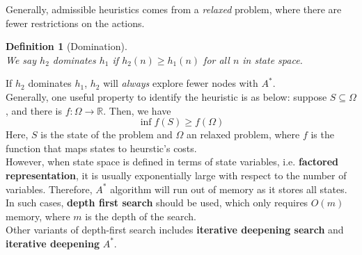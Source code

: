 \documentclass[12pt]{article}
\newtheorem{definition}{Definition}[section]
\theoremstyle{definition}
\begin{document}
Generally, admissible heuristics comes from a \textit{relaxed} problem, where there are fewer restrictions on the actions.
\begin{definition}[Domination]
\hfill\\\normalfont We say $h_2$ dominates $h_1$ if $h_2(n)\geq h_1(n)$ for all $n$ in state space.
\end{definition}
If $h_2$ dominates $h_1$, $h_2$ will \textit{always} explore fewer nodes with $A^\ast$.\\
Generally, one useful property to identify the heuristic is as below: suppose $S\subseteq \Omega$, and there is $f:\Omega\to \mathbb{R}$. Then, we have
\[
\inf f(S) \geq f(\Omega)
\]
Here, $S$ is the state of the problem and $\Omega$ an relaxed problem, where $f$ is the function that maps states to heurstic's costs.\\

However, when state space is defined in terms of state variables, i.e. \textbf{factored representation}, it is usually exponentially large with respect to the number of variables. Therefore, $A^\ast$ algorithm will run out of memory as it stores all states. In such cases, \textbf{depth first search} should be used, which only requires $O(m)$ memory, where $m$ is the depth of the search.\\
Other variants of depth-first search includes \textbf{iterative deepening search} and \textbf{iterative deepening} $A^\ast$.
\end{document}
